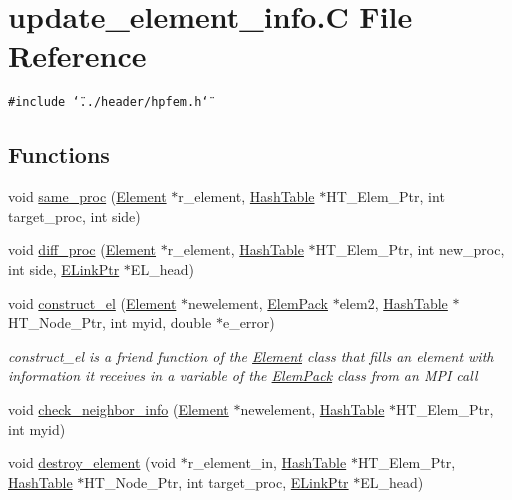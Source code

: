 \hypertarget{update__element__info_8C}{
\section{update\_\-element\_\-info.C File Reference}
\label{update__element__info_8C}
}
{\tt \#include \char`\"{}../header/hpfem.h\char`\"{}}\par
\subsection*{Functions}
\begin{CompactItemize}
\item 
void \hyperlink{update__element__info_8C_a0}{same\_\-proc} (\hyperlink{classElement}{Element} $\ast$r\_\-element, \hyperlink{classHashTable}{Hash\-Table} $\ast$HT\_\-Elem\_\-Ptr, int target\_\-proc, int side)
\item 
void \hyperlink{update__element__info_8C_a1}{diff\_\-proc} (\hyperlink{classElement}{Element} $\ast$r\_\-element, \hyperlink{classHashTable}{Hash\-Table} $\ast$HT\_\-Elem\_\-Ptr, int new\_\-proc, int side, \hyperlink{structElementLink}{ELink\-Ptr} $\ast$EL\_\-head)
\item 
void \hyperlink{update__element__info_8C_a2}{construct\_\-el} (\hyperlink{classElement}{Element} $\ast$newelement, \hyperlink{structElemPack}{Elem\-Pack} $\ast$elem2, \hyperlink{classHashTable}{Hash\-Table} $\ast$HT\_\-Node\_\-Ptr, int myid, double $\ast$e\_\-error)
\begin{CompactList}\small\item\em construct\_\-el is a friend function of the \hyperlink{classElement}{Element} class that fills an element with information it receives in a variable of the \hyperlink{structElemPack}{Elem\-Pack} class from an MPI call \item\end{CompactList}\item 
void \hyperlink{update__element__info_8C_a3}{check\_\-neighbor\_\-info} (\hyperlink{classElement}{Element} $\ast$newelement, \hyperlink{classHashTable}{Hash\-Table} $\ast$HT\_\-Elem\_\-Ptr, int myid)
\item 
void \hyperlink{update__element__info_8C_a4}{destroy\_\-element} (void $\ast$r\_\-element\_\-in, \hyperlink{classHashTable}{Hash\-Table} $\ast$HT\_\-Elem\_\-Ptr, \hyperlink{classHashTable}{Hash\-Table} $\ast$HT\_\-Node\_\-Ptr, int target\_\-proc, \hyperlink{structElementLink}{ELink\-Ptr} $\ast$EL\_\-head)

\end{CompactItemize}
